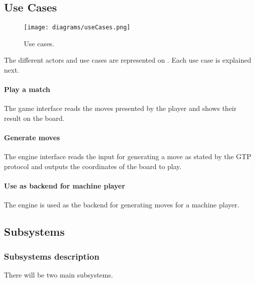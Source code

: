 \subsection{Use Cases}

\begin{figure}[h]
	\begin{center}
		\texttt{[image: diagrams/useCases.png]}
		\caption{Use cases.}\label{fig:useCases}
	\end{center}
\end{figure}

The different actors and use cases are represented on . Each
use case is explained next.

\paragraph{Play a match}

The game interface reads the moves presented by the player and shows their
result on the board.

\paragraph{Generate moves}

The engine interface reads the input for generating a move as stated by the
GTP protocol and outputs the coordinates of the board to play.

\paragraph{Use as backend for machine player}

The engine is used as the backend for generating moves for a machine player.

\subsection{Subsystems}

\subsubsection{Subsystems description}

There will be two main subsystems.



